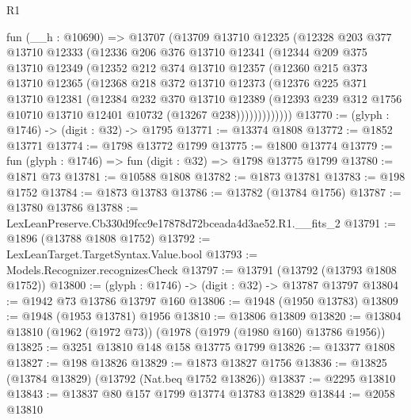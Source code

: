 \begin{lexlean}{R1}
\begin{coremodule}
      fun (__h : @10690) =>
      @13707
        (@13709
          @13710
          @12325
          (@12328
            @203
            @377
            @13710
            @12333
            (@12336
              @206
              @376
              @13710
              @12341
              (@12344
                @209
                @375
                @13710
                @12349
                (@12352
                  @212
                  @374
                  @13710
                  @12357
                  (@12360
                    @215
                    @373
                    @13710
                    @12365
                    (@12368
                      @218
                      @372
                      @13710
                      @12373
                      (@12376
                        @225
                        @371
                        @13710
                        @12381
                        (@12384
                          @232
                          @370
                          @13710
                          @12389
                          (@12393
                            @239
                            @312
                            @1756
                            @10710
                            @13710
                            @12401
                            @10732
                            (@13267 @238)))))))))))))
@13770 := (glyph : @1746) -> (digit : @32) -> @1795
@13771 := @13374 @1808
@13772 := @1852 @13771
@13774 := @1798 @13772 @1799
@13775 := @1800 @13774
@13779 := fun (glyph : @1746) => fun (digit : @32) => @1798 @13775 @1799
@13780 := @1871 @73
@13781 := @10588 @1808
@13782 := @1873 @13781
@13783 := @198 @1752
@13784 := @1873 @13783
@13786 := @13782 (@13784 @1756)
@13787 := @13780 @13786
@13788 := LexLeanPreserve.Cb330d9fcc9e17878d72bceada4d3ae52.R1.__fits_2
@13791 := @1896 (@13788 @1808 @1752)
@13792 := LexLeanTarget.TargetSyntax.Value.bool
@13793 := Models.Recognizer.recognizesCheck
@13797 := @13791 (@13792 (@13793 @1808 @1752))
@13800 := (glyph : @1746) -> (digit : @32) -> @13787 @13797
@13804 := @1942 @73 @13786 @13797 @160
@13806 := @1948 (@1950 @13783)
@13809 := @1948 (@1953 @13781) @1956
@13810 := @13806 @13809
@13820 := @13804 @13810 (@1962 (@1972 @73)) (@1978 (@1979 (@1980 @160) @13786 @1956))
@13825 := @3251 @13810 @148 @158 @13775 @1799
@13826 := @13377 @1808
@13827 := @198 @13826
@13829 := @1873 @13827 @1756
@13836 := @13825 (@13784 @13829) (@13792 (Nat.beq @1752 @13826))
@13837 := @2295 @13810
@13843 := @13837 @80 @157 @1799 @13774 @13783 @13829
@13844 := @2058 @13810

\end{coremodule}
\end{lexlean}
